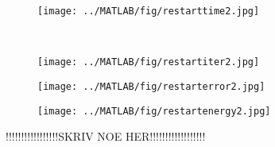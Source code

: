 \begin{figure}[H]
        \centering
        \begin{subfigure}[b]{0.45\textwidth}
                \texttt{[image: ../MATLAB/fig/restarttime2.jpg]}
                \caption{  }
                \label{fig:restarttime2}
        \end{subfigure}
        ~
        \begin{subfigure}[b]{0.45\textwidth}
                \texttt{[image: ../MATLAB/fig/restartiter2.jpg]}
                \caption{  }
                \label{fig:restartiter2}
        \end{subfigure}
        \begin{subfigure}[b]{0.45\textwidth}
                \texttt{[image: ../MATLAB/fig/restarterror2.jpg]}
                \caption{  }
                \label{fig:restarterror2}
        \end{subfigure}
        \begin{subfigure}[b]{0.45\textwidth}
                \texttt{[image: ../MATLAB/fig/restartenergy2.jpg]}
                \caption{  }
                \label{fig:restartenergy2}
        \end{subfigure}
        \caption{ !!!!!!!!!!!!!!!!!SKRIV NOE HER!!!!!!!!!!!!!!!!!!  }
        \label{fig:restart2}
\end{figure}

